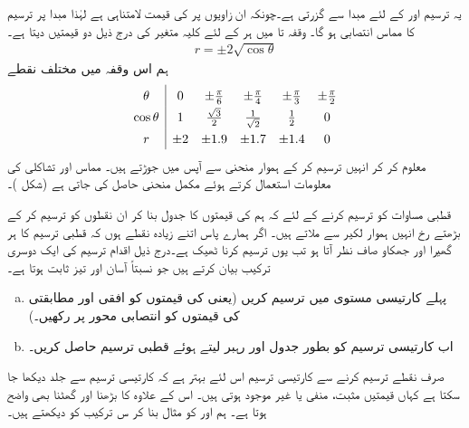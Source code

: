 یہ ترسیم  اور  کے لئے مبدا سے گزرتی ہے۔چونکہ ان زاویوں پر  کی قیمت لامتناہی ہے لہٰذا مبدا پر ترسیم کا مماس انتصابی ہو گا۔ وقفہ  تا  میں ہر  کے لئے  کلیہ  متغیر  کی درج ذیل دو قیمتیں دیتا ہے۔
\begin{align*}
r=\pm 2\sqrt{\cos\theta}
\end{align*}
ہم اس وقفہ میں مختلف نقطے
\begin{align*}
\renewcommand{\arraystretch}{1.4}
\begin{array}{c|ccccc}
\theta&0&\pm\tfrac{\pi}{6}&\pm\tfrac{\pi}{4}&\pm\tfrac{\pi}{3}&\pm\tfrac{\pi}{2}\\
\cos\theta&1&\tfrac{\sqrt{3}}{2}&\tfrac{1}{\sqrt{2}}&\tfrac{1}{2}&0\\
r&\pm 2&\pm 1.9&\pm 1.7&\pm 1.4&0
\end{array}
\end{align*}
 معلوم کر کر انہیں ترسیم کر کے ہموار منحنی سے آپس میں جوڑتے ہیں۔ مماس اور تشاکلی کی معلومات استعمال کرتے ہوئے مکمل منحنی حاصل کی جاتی ہے (شکل )۔ 

قطبی مساوات  کو ترسیم کرنے کے لئے کہ ہم  کی قیمتوں کا جدول بنا کر ان نقطوں کو ترسیم کر کے بڑھتے  رخ انہیں ہموار لکیر سے ملاتے ہیں۔ اگر ہمارے پاس اتنے زیادہ نقطے ہوں کہ قطبی ترسیم کا ہر گھیرا اور جھکاو صاف نظر آتا ہو تب یوں ترسیم کرنا ٹھیک ہے۔درج ذیل اقدام ترسیم کی ایک دوسری ترکیب بیان کرتے ہیں جو نسبتاً آسان اور تیز ثابت ہوتا ہے۔
\begin{enumerate}[a.]
\item
پہلے کارتیسی  مستوی میں  ترسیم کریں (یعنی  کی قیمتوں کو افقی اور مطابقتی  کی قیمتوں کو انتصابی محور پر رکھیں۔) 
\item
اب کارتیسی ترسیم کو بطور جدول اور رہبر  لیتے ہوئے قطبی ترسیم حاصل کریں۔ 
\end{enumerate}

صرف نقطے ترسیم کرنے سے کارتیسی ترسیم اس لئے بہتر ہے کہ کارتیسی ترسیم سے جلد دیکھا جا سکتا ہے کہاں قیمتیں مثبت، منفی یا غیر موجود ہوتی ہیں۔ اس کے علاوہ  کا بڑھنا اور گھٹنا بھی واضح ہوتا ہے۔ ہم  اور  کو مثال بنا کر س ترکیب کو دیکھتے ہیں۔


